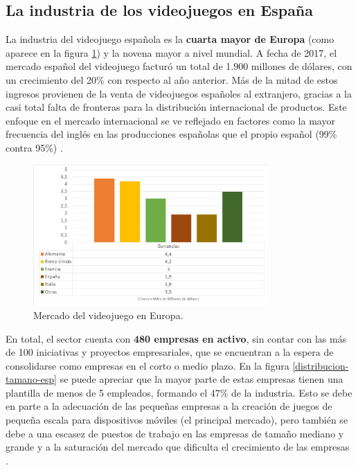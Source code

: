 \subsection{La industria de los videojuegos en España}
La industria del videojuego española es la \textbf{cuarta mayor de Europa} (como aparece en la figura \ref{distribucion-mercado-europa}) y la novena mayor a nivel mundial. A fecha de 2017, el mercado español del videojuego facturó un total de 1.900 millones de dólares, con un crecimiento del 20\% con respecto al año anterior. Más de la mitad de estos ingresos provienen de la venta de videojuegos españoles al extranjero, gracias a la casi total falta de fronteras para la distribución internacional de productos. Este enfoque en el mercado internacional se ve reflejado en factores como la mayor frecuencia del inglés en las producciones españolas que el propio español (99\% contra 95\%) \cite{libro_blanco}.

\begin{figure}[h]
    \centering
    \includegraphics[width=0.8\textwidth]{images/estadodelarte/mercado/distribucion-mercado-europa}
    \caption{Mercado del videojuego en Europa.}
    \label{distribucion-mercado-europa}
\end{figure}

En total, el sector cuenta con \textbf{480 empresas en activo}, sin contar con las más de 100 iniciativas y proyectos empresariales, que se encuentran a la espera de consolidarse como empresas en el corto o medio plazo. En la figura \ref{distribucion-tamano-esp} se puede apreciar que la mayor parte de estas empresas tienen una plantilla de menos de 5 empleados, formando el 47\% de la industria. Esto se debe en parte a la adecuación de las pequeñas empresas a la creación de juegos de pequeña escala para dispositivos móviles (el principal mercado), pero también se debe a una escasez de puestos de trabajo en las empresas de tamaño mediano y grande y a la saturación del mercado que dificulta el crecimiento de las empresas \cite{libro_blanco}.

